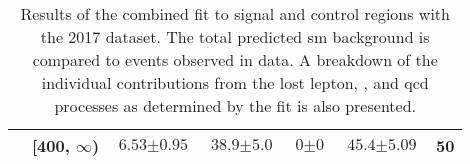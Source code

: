 \begin{table}[htbp]
\begin{tabular*}{\linewidth}{@{\extracolsep{\fill}}llccccr}
        & [400, $\infty$) &    $\text{6.53} \pm \text{0.95}$ &      $\text{38.9} \pm \text{5.0}$ &      $\text{0} \pm \text{0}$ &      $\text{45.4} \pm \text{5.09}$ &     50 \\
       \bottomrule
    \end{tabular*}
    \caption[Results of the combined fit to signal and control regions with the 2017 dataset]{Results of the combined fit to signal and control regions with the 2017 dataset. The total predicted \acrlong{sm} background is compared to events observed in data. A breakdown of the individual contributions from the lost lepton, \ztonunu, and \acrshort{qcd} processes as determined by the fit is also presented.}
    \label{tab:yields_SR_B_only_2017}
\end{table}



